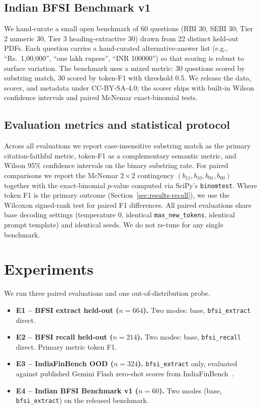 \documentclass{article}
\begin{document}
\subsection{Indian BFSI Benchmark v1}

We hand-curate a small open benchmark of 60 questions (RBI 30, SEBI 30; Tier 2 numeric 30, Tier 3 heading-extractive 30) drawn from 22 distinct held-out PDFs. Each question carries a hand-curated alternative-answer list (e.g., ``Rs.~1{,}00{,}000'', ``one lakh rupees'', ``INR 100000'') so that scoring is robust to surface variation. The benchmark uses a mixed metric: 30 questions scored by substring match, 30 scored by token-F1 with threshold 0.5. We release the data, scorer, and metadata under CC-BY-SA-4.0; the scorer ships with built-in Wilson confidence intervals and paired McNemar exact-binomial tests.

\subsection{Evaluation metrics and statistical protocol}

Across all evaluations we report case-insensitive substring match as the primary citation-faithful metric, token-F1 as a complementary semantic metric, and Wilson 95\% confidence intervals on the binary substring rate. For paired comparisons we report the McNemar $2\times2$ contingency $(b_{11}, b_{10}, b_{01}, b_{00})$ together with the exact-binomial $p$-value computed via SciPy's \texttt{binomtest}. Where token F1 is the primary outcome (Section~\ref{sec:results-recall}), we use the Wilcoxon signed-rank test for paired F1 differences. All paired evaluations share base decoding settings (temperature 0, identical \texttt{max\_new\_tokens}, identical prompt template) and identical seeds. We do not re-tune for any single benchmark.

\section{Experiments}

We run three paired evaluations and one out-of-distribution probe.

\begin{itemize}
  \item \textbf{E1 -- BFSI extract held-out ($n{=}664$).} Two modes: base, \texttt{bfsi\_extract} direct.
  \item \textbf{E2 -- BFSI recall held-out ($n{=}214$).} Two modes: base, \texttt{bfsi\_recall} direct. Primary metric token F1.
  \item \textbf{E3 -- IndiaFinBench OOD ($n{=}324$).} \texttt{bfsi\_extract} only, evaluated against published Gemini Flash zero-shot scores from IndiaFinBench~\citep{pall2026indiafinbench}.
  \item \textbf{E4 -- Indian BFSI Benchmark v1 ($n{=}60$).} Two modes (base, \texttt{bfsi\_extract}) on the released benchmark.
\end{itemize}
\end{document}
